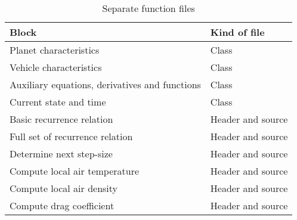 \begin{table}[!ht]
\begin{center}
\caption{Separate function files}
\label{tab:classes}
\begin{tabular}{|l|l|}
\hline 
\textbf{Block} & \textbf{Kind of file}  \\ \hline 
Planet characteristics & Class \\ \hline
Vehicle characteristics & Class \\ \hline
Auxiliary equations, derivatives and functions & Class \\ \hline
Current state and time & Class \\ \hline
Basic recurrence relation & Header and source \\ \hline
Full set of recurrence relation & Header and source \\ \hline
Determine next step-size & Header and source \\ \hline
Compute local air temperature & Header and source \\ \hline
Compute local air density & Header and source \\ \hline
Compute drag coefficient & Header and source \\ \hline
\end{tabular}
\end{center}
\end{table}


